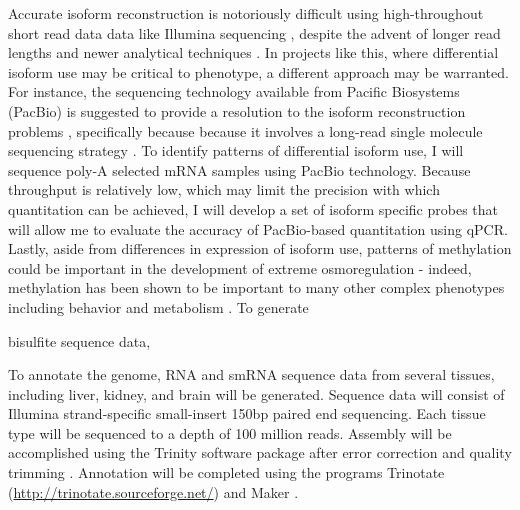 \documentclass[11pt]{article}
\begin{document}
Accurate isoform reconstruction is notoriously difficult using high-throughout short read data data like Illumina sequencing \citep{Pyrkosz:2013tm,Hiller:2009be}, despite the advent of longer read lengths and newer analytical techniques \citep{LeGault:2013gw,Jiang:2009bw}. In projects like this, where differential isoform use may be critical to phenotype, a different approach may be warranted. For instance, the sequencing technology available from Pacific Biosystems (PacBio) is suggested to provide a resolution to the isoform reconstruction problems \citep{Au:2013hp}, specifically because because it involves a long-read single molecule sequencing strategy \citep{Eid:2009kva}.  To identify patterns of differential isoform use, I will sequence poly-A selected mRNA samples using PacBio technology. Because throughput is relatively low, which may limit the precision with which quantitation can be achieved, I will develop a set of isoform specific probes that will allow me to evaluate the accuracy of PacBio-based quantitation using qPCR.   \\ 

Lastly, aside from differences in expression of isoform use, patterns of methylation could be important in the development of extreme osmoregulation - indeed, methylation has been shown to be important to many other complex phenotypes including behavior \citep{Lyko:2010dra} and metabolism \citep{Foret:2012jf}. To generate  

bisulfite sequence data, 





To annotate the genome, RNA and smRNA sequence data from several tissues, including liver, kidney, and brain will be generated. Sequence data will consist of Illumina strand-specific small-insert 150bp paired end sequencing. Each tissue type will be sequenced to a depth of 100 million reads. Assembly will be accomplished using the Trinity software package \citep{Haas:2013jq,Grabherr:2011jb} after error correction \citep{MacManes:2013ec} and quality trimming \citep{MacManes:2013ex}. Annotation will be completed using the programs Trinotate (\url{http://trinotate.sourceforge.net/}) and Maker \citep{Cantarel:2008jo}. \\
\end{document}
